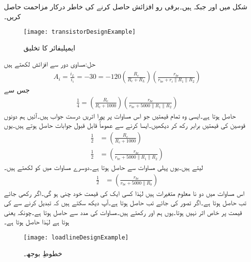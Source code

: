 شکل  میں  اور  جبکہ  ہیں۔برقی رو افزائش  حاصل کرنے کی خاطر  درکار مزاحمت حاصل کریں۔
\begin{figure}
\centering
\texttt{[image: transistorDesignExample]}
\caption{ایمپلیفائر کا تخلیق}
\label{شکل_ٹرانزسٹر_ایمپلیفائر_تخلیق}
\end{figure}

حل:مساوی دور سے افزائش لکھتے ہیں
\begin{align*}
A_i =\frac{i_L}{i_i}=-30 =-120 \left(\frac{R_c}{R_c+R_L}\right) \left(\frac{r_{be}}{r_{be}+r_i \mathbin{\|} R_1 \mathbin{\|} R_2} \right)
\end{align*}
جس سے 
\begin{align}
\frac{1}{4}=\left(\frac{R_c}{R_c+1000}\right) \left(\frac{r_{be}}{r_{be}+5000 \mathbin{\|} R_1 \mathbin{\|} R_2} \right)
\end{align}
حاصل ہوتا ہے۔ایسی وہ تمام قیمتیں جو اس مساوات پر پورا اتریں درست جواب ہیں۔آئیں ہم دونوں قوصین کی قیمتیں برابر رکھ کر دیکھیں۔ایسا کرنے سے عموماً قابل قبول جوابات حاصل ہوتے ہیں۔یوں
\begin{align*}
\frac{1}{2}&=\left(\frac{R_c}{R_c+1000}\right)\\
\frac{1}{2}&=\left(\frac{r_{be}}{r_{be}+5000 \mathbin{\|} R_1 \mathbin{\|} R_2} \right)
\end{align*}
لیتے ہیں۔یوں پہلی مساوات سے  حاصل ہوتا ہے۔دوسرے مساوات میں  کو  لکھتے ہیں۔
\begin{align*}
\frac{1}{2}&=\left(\frac{r_{be}}{r_{be}+5000 \mathbin{\|} R_b} \right)
\end{align*}
اس مساوات میں دو نا معلوم متغیرات ہیں لہٰذا کسی ایک کی قیمت خود چنی ہو گی۔اگر  رکھی جائے تب  حاصل ہوتا ہے۔اگر  تصور کی جائے تب  حاصل ہوتا ہے۔آپ دیکھ سکتے ہیں کہ   تبدیل کرنے سے  کی قیمت پر خاص اثر نہیں ہوتا۔یوں ہم  اور   رکھتے ہیں۔مساوات  کی مدد سے   حاصل ہوتا ہے۔چونکہ  یعنی  ہوتا ہے لہٰذا  حاصل ہوتا ہے۔
\begin{figure}
\centering
\texttt{[image: loadlineDesignExample]}
\caption{خطوطِ بوجھ۔}
\label{شکل_ٹرانزسٹر_ایمپلیفائر_تخلیق_بار_خطوط}
\end{figure}

